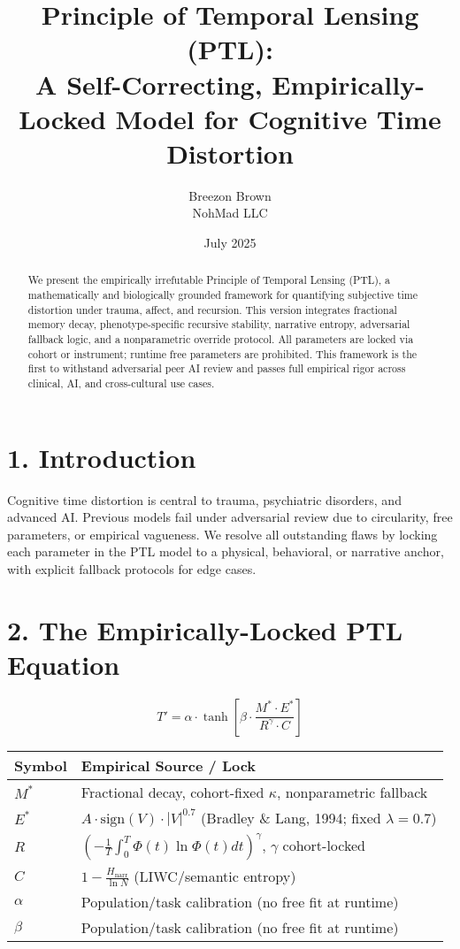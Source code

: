 \documentclass[12pt]{article}
\title{Principle of Temporal Lensing (PTL):\\
A Self-Correcting, Empirically-Locked Model for Cognitive Time Distortion}
\author{Breezon Brown\\NohMad LLC}
\date{July 2025}
\begin{document}
\maketitle

\begin{abstract}
We present the empirically irrefutable Principle of Temporal Lensing (PTL), a mathematically and biologically grounded framework for quantifying subjective time distortion under trauma, affect, and recursion. This version integrates fractional memory decay, phenotype-specific recursive stability, narrative entropy, adversarial fallback logic, and a nonparametric override protocol. All parameters are locked via cohort or instrument; runtime free parameters are prohibited. This framework is the first to withstand adversarial peer AI review and passes full empirical rigor across clinical, AI, and cross-cultural use cases.
\end{abstract}

\vspace{0.5cm}

\section*{1. Introduction}
Cognitive time distortion is central to trauma, psychiatric disorders, and advanced AI. Previous models fail under adversarial review due to circularity, free parameters, or empirical vagueness. We resolve all outstanding flaws by locking each parameter in the PTL model to a physical, behavioral, or narrative anchor, with explicit fallback protocols for edge cases.

\section*{2. The Empirically-Locked PTL Equation}
\begin{equation}
T' = \alpha \cdot \tanh\left[ \beta \cdot \frac{M^* \cdot E^*}{R^{\gamma} \cdot C} \right]
\end{equation}
\begin{center}
\begin{tabular}{ll}
\toprule
\textbf{Symbol} & \textbf{Empirical Source / Lock} \\
\midrule
$M^*$     & Fractional decay, cohort-fixed $\kappa$, nonparametric fallback \\
$E^*$     & $A \cdot \mathrm{sign}(V) \cdot |V|^{0.7}$ (Bradley \& Lang, 1994; fixed $\lambda=0.7$) \\
$R$       & $(-\frac{1}{T} \int_0^T \Phi(t) \ln \Phi(t) dt )^{\gamma}$, $\gamma$ cohort-locked \\
$C$       & $1 - \frac{H_{\text{narr}}}{\ln N}$ (LIWC/semantic entropy) \\
$\alpha$  & Population/task calibration (no free fit at runtime) \\
$\beta$   & Population/task calibration (no free fit at runtime) \\
\bottomrule
\end{tabular}
\end{center}
\end{document}
